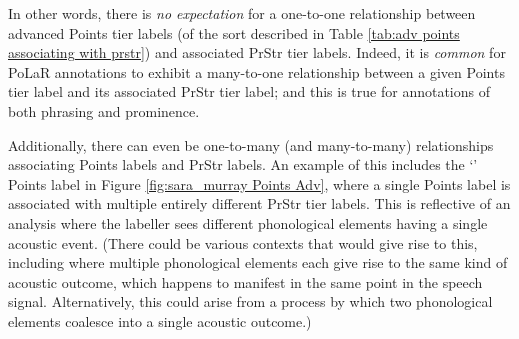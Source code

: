 \documentclass[11pt, twoside]{memoir}
\def\textlabel#1{{\relsize{-.5}\fontspec[Mapping=tex-text]{Roboto Mono}{#1}}}
\begin{document}
In other words, there is \textit{no expectation} for a one-to-one relationship between advanced Points tier labels (of the sort described in Table \ref{tab:adv points associating with prstr}) and associated PrStr tier labels. Indeed, it is \textit{common} for PoLaR annotations to exhibit a {many-to-one} relationship between a given Points tier label and its associated PrStr tier label; and this is true for annotations of both phrasing and prominence.

Additionally, there can even be one-to-many ({and many-to-many}) relationships associating Points labels and PrStr labels. An example of this includes the ‘\textlabel{*</*>}’ Points label in Figure \ref{fig:sara_murray Points Adv}, where a single Points label is associated with multiple entirely different PrStr tier labels. This is reflective of an analysis where the labeller sees different phonological elements having a single acoustic event. (There could be various contexts that would give rise to this, including where multiple phonological elements each give rise to the same kind of acoustic outcome, which happens to manifest in the same point in the speech signal. Alternatively, this could arise from a process by which two phonological elements coalesce into a single acoustic outcome.)
\end{document}
